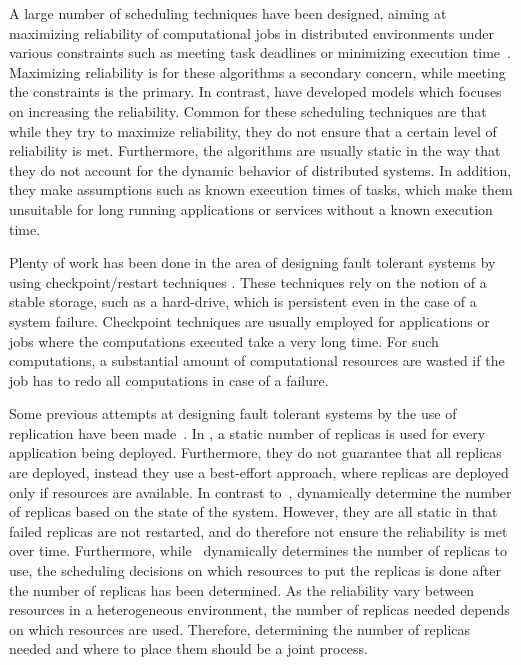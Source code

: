 \documentclass{cslthse-msc}
\begin{document}
A large number of scheduling techniques have been designed, aiming at maximizing reliability of computational jobs in distributed environments under various constraints such as meeting task deadlines or minimizing execution time~\cite{algoOptTimeMaxRel, optTaskAllocationForMaxRel, taskAllocation, taskAllocationSwarm, algoMaxRelEndToEndConstraint, algoMinExTime, schedReplicas}. Maximizing reliability is for these algorithms a secondary concern, while meeting the constraints is the primary. In contrast, \cite{optResourceAllMaxPerformance, matchSchedAlgoMinFailure, safetyRelTaskAllocation, improvedTaskAllMaxRel} have developed models which focuses on increasing the reliability. Common for these scheduling techniques are that while they try to maximize reliability, they do not ensure that a certain level of reliability is met. Furthermore, the algorithms are usually static in the way that they do not account for the dynamic behavior of distributed systems. In addition, they make assumptions such as known execution times of tasks, which make them unsuitable for long running applications or services without a known execution time.

Plenty of work has been done in the area of designing fault tolerant systems by using checkpoint/restart techniques \cite{adaptiveCheckPointAndRep, IEEEfaultTolerantSys, faultTolerantDeadlock}. These techniques rely on the notion of a stable storage, such as a hard-drive, which is persistent even in the case of a system failure. Checkpoint techniques are usually employed for applications or jobs where the computations executed take a very long time. For such computations, a substantial amount of computational resources are wasted if the job has to redo all computations in case of a failure.

Some previous attempts at designing fault tolerant systems by the use of replication have been made~\cite{designFaultTolerantSched, evalReplicationSched, taskSchedulingReplication, effTaskReplMobGrid, relGridServicePredConstraint}. In \cite{evalReplicationSched}, a static number of replicas is used for every application being deployed. Furthermore, they do not guarantee that all replicas are deployed, instead they use a best-effort approach, where replicas are deployed only if resources are available. In contrast to~\cite{evalReplicationSched}, \cite{ effTaskReplMobGrid, taskSchedulingReplication, designFaultTolerantSched} dynamically determine the number of replicas based on the state of the system. However, they are all static in that failed replicas are not restarted, and do therefore not ensure the reliability is met over time. Furthermore, while~\cite{designFaultTolerantSched} dynamically determines the number of replicas to use, the scheduling decisions on which resources to put the replicas is done after the number of replicas has been determined. As the reliability vary between resources in a heterogeneous environment, the number of replicas needed depends on which resources are used. Therefore, determining the number of replicas needed and where to place them should be a joint process.
\end{document}
